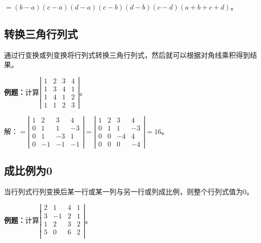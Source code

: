 $=(b-a)(c-a)(d-a)(c-b)(d-b)(c-d)(a+b+c+d)$。

\subsection{转换三角行列式}

通过行变换或列变换将行列式转换三角行列式，然后就可以根据对角线乘积得到结果。

\textbf{例题：}计算$\left|\begin{array}{cccc} 
    1 & 2 & 3 & 4 \\
    1 & 3 & 4 & 1 \\
    1 & 4 & 1 & 2 \\
    1 & 1 & 2 & 3
\end{array}\right|$。

解：$=\left|\begin{array}{cccc} 
    1 & 2 & 3 & 4 \\
    0 & 1 & 1 & -3 \\
    0 & 1 & -3 & 1 \\
    0 & -1 & -1 & -1
\end{array}\right|
=\left|\begin{array}{cccc} 
    1 & 2 & 3 & 4 \\
    0 & 1 & 1 & -3 \\
    0 & 0 & -4 & 4 \\
    0 & 0 & 0 & -4
\end{array}\right|=16$。

\subsection{成比例为0}

当行列式行列变换后某一行或某一列与另一行或列成比例，则整个行列式值为0。

\textbf{例题：}计算$\left|\begin{array}{cccc} 
    2 & 1 & 4 & 1 \\
    3 & -1  & 2 & 1 \\
    1 & 2 & 3 & 2 \\
    5 & 0 & 6 & 2 \\
\end{array}\right|$。

